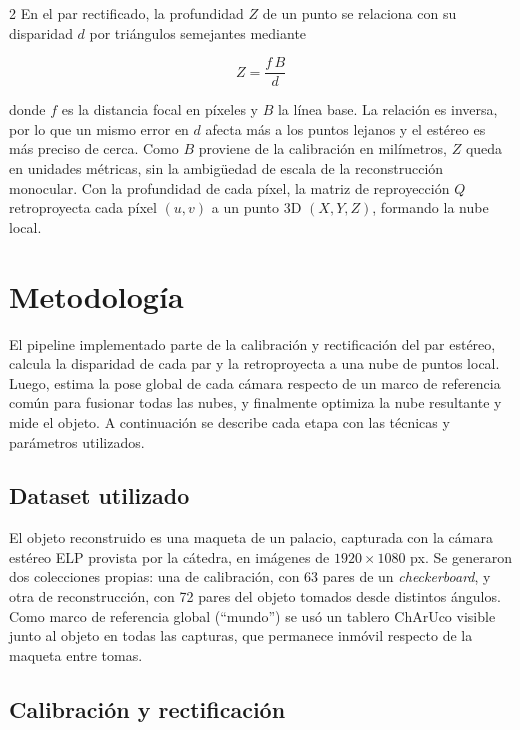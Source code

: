 \documentclass[10pt,a4paper]{article}
\begin{document}
\begin{multicols}{2}
En el par rectificado, la profundidad $Z$ de un punto se relaciona con su disparidad $d$ por
triángulos semejantes mediante

\begin{equation}\label{eq:profundidad}
Z = \frac{f\,B}{d}
\end{equation}

donde $f$ es la distancia focal en píxeles y $B$ la línea base. La relación es inversa, por lo
que un mismo error en $d$ afecta más a los puntos lejanos y el estéreo es más preciso de cerca.
Como $B$ proviene de la calibración en milímetros, $Z$ queda en unidades métricas, sin la
ambigüedad de escala de la reconstrucción monocular. Con la profundidad de cada píxel, la matriz
de reproyección $Q$ retroproyecta cada píxel $(u,v)$ a un punto 3D $(X,Y,Z)$, formando la nube
local.

\section{Metodología}

El pipeline implementado parte de la calibración y rectificación del par estéreo, calcula la
disparidad de cada par y la retroproyecta a una nube de puntos local. Luego, estima la pose global de cada
cámara respecto de un marco de referencia común para fusionar todas las nubes, y finalmente optimiza
la nube resultante y mide el objeto. A continuación se describe cada etapa con las técnicas y
parámetros utilizados.

\subsection{Dataset utilizado}
El objeto reconstruido es una maqueta de un palacio, capturada con la cámara estéreo ELP
provista por la cátedra, en imágenes de $1920\times1080$ px. Se generaron dos colecciones
propias: una de calibración, con 63 pares de un \emph{checkerboard}, y otra de
reconstrucción, con 72 pares del objeto tomados desde distintos ángulos. Como marco de
referencia global (``mundo'') se usó un tablero ChArUco visible junto al objeto en todas
las capturas, que permanece inmóvil respecto de la maqueta entre tomas.

\subsection{Calibración y rectificación}


\end{multicols}
\end{document}
